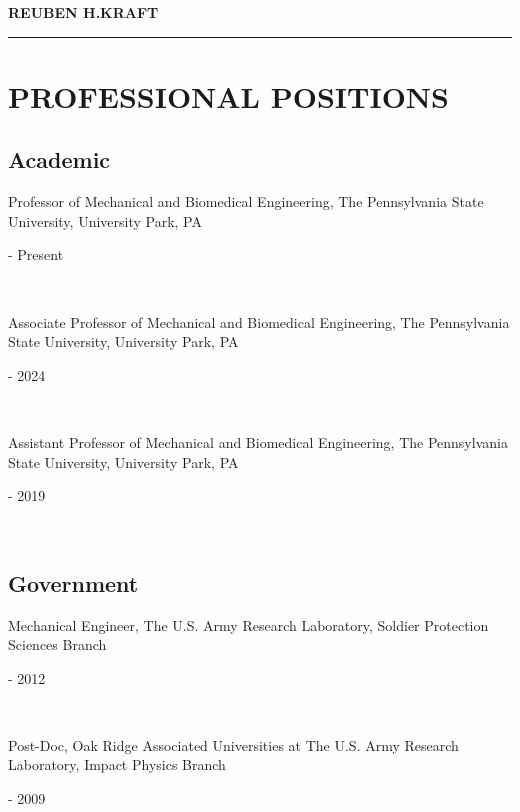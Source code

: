 \documentclass[a4paper,10pt]{article}
\author{}
\date{}
\begin{document}
    \begin{center}
    \LARGE \textbf{\textsc{REUBEN H.KRAFT}} \\
    \rule{\linewidth}{2pt}
    \end{center}
    \normalsize %
    


    \section*{PROFESSIONAL POSITIONS}
    
    \subsection*{Academic}
    
            \noindent \parbox[t]{0.8\linewidth}{\raggedright Professor of Mechanical and Biomedical Engineering, The Pennsylvania State University, University Park, PA} \hfill \parbox[t]{0.2\linewidth}{ - Present} \\
            
            \noindent \parbox[t]{0.8\linewidth}{\raggedright Associate Professor of Mechanical and Biomedical Engineering, The Pennsylvania State University, University Park, PA} \hfill \parbox[t]{0.2\linewidth}{ - 2024} \\
            
            \noindent \parbox[t]{0.8\linewidth}{\raggedright Assistant Professor of Mechanical and Biomedical Engineering, The Pennsylvania State University, University Park, PA} \hfill \parbox[t]{0.2\linewidth}{ - 2019} \\
            
    \subsection*{Government}
    
            \noindent \parbox[t]{0.8\linewidth}{\raggedright Mechanical Engineer, The U.S. Army Research Laboratory, Soldier Protection Sciences Branch} \hfill \parbox[t]{0.2\linewidth}{ - 2012} \\
            
            \noindent \parbox[t]{0.8\linewidth}{\raggedright Post-Doc, Oak Ridge Associated Universities at The U.S. Army Research Laboratory, Impact Physics Branch} \hfill \parbox[t]{0.2\linewidth}{ - 2009} \\
            
\end{document}
